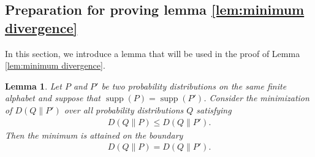\documentclass[journal,onecolumn]{IEEEtran}
\newtheorem{lemma}[theorem]{Lemma}
\theoremstyle{definition}
\theoremstyle{remark}
\begin{document}
\subsection{Preparation for proving lemma \ref{lem:minimum divergence}}
    In this section, we introduce a lemma that will be used in the proof of Lemma \ref{lem:minimum divergence}.
    \begin{lemma}\label{lem:boundary}
    Let $P$ and $P'$ be two probability distributions on the same finite alphabet and suppose that $\operatorname{supp}(P) = \operatorname{supp}(P')$.
    Consider the minimization of $D(Q\|P')$ over all probability distributions $Q$ satisfying
    \begin{align*}
        D(Q\|P)\leq D(Q\|P').
    \end{align*}
    Then the minimum is attained on the boundary
    \begin{align*}
        D(Q\|P)=D(Q\|P').
    \end{align*}
    \end{lemma}
\end{document}
